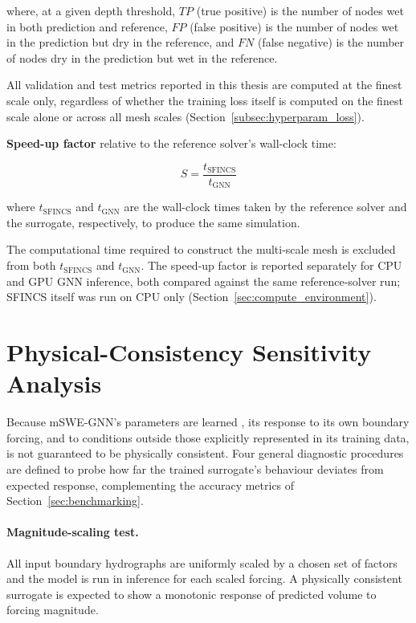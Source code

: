 \documentclass[12pt,a4paper]{report}
\begin{document}
where, at a given depth threshold, $TP$ (true positive) is the number of nodes wet in
both prediction and reference, $FP$ (false positive) is the number of nodes wet in the
prediction but dry in the reference, and $FN$ (false negative) is the number of nodes
dry in the prediction but wet in the reference.
 
\bigskip
 
All validation and test metrics reported in this thesis are
computed at the finest scale only, regardless of whether the training loss itself is
computed on the finest scale alone or across all mesh scales
(Section~\ref{subsec:hyperparam_loss}).
 
\textbf{Speed-up factor} relative to the reference solver's wall-clock time:
 
\begin{equation}
    S = \frac{t_\text{SFINCS}}{t_\text{GNN}}
    \label{eq:speedup}
\end{equation}
 
where $t_\text{SFINCS}$ and $t_\text{GNN}$ are the wall-clock times taken by the
reference solver and the surrogate, respectively, to produce the same simulation.
 
The computational time required to construct the multi-scale mesh is excluded from
both $t_\text{SFINCS}$ and $t_\text{GNN}$. The speed-up factor is reported separately
for CPU and GPU GNN inference, both compared against the same reference-solver run;
SFINCS itself was run on CPU only (Section~\ref{sec:compute_environment}).
 
\section{Physical-Consistency Sensitivity Analysis}
\label{sec:physics_sensitivity_method}
 
Because mSWE-GNN's parameters are learned 
, its
response to its own boundary forcing, and to conditions outside those explicitly
represented in its training data, is not guaranteed to be physically consistent. Four
general diagnostic procedures are defined to probe how far the trained surrogate's
behaviour deviates from expected response, complementing the accuracy
metrics of Section~\ref{sec:benchmarking}. 
 
\paragraph{Magnitude-scaling test.}
All input boundary hydrographs are uniformly scaled
by a chosen set of factors and the model is run in inference for each scaled forcing. 
 A physically consistent surrogate is expected to show a monotonic response of
predicted volume to forcing magnitude.
 
\end{document}
